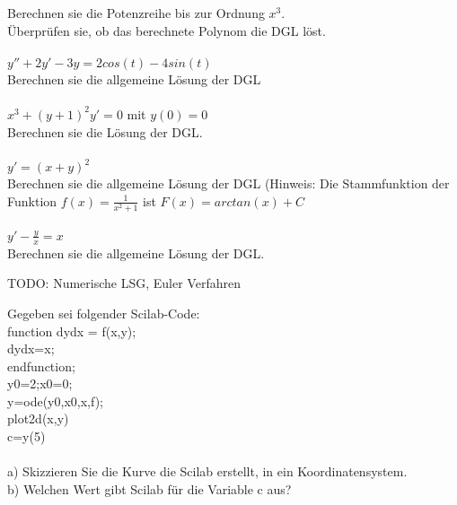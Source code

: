 \documentclass[A4]{scrartcl}
\begin{document}
Berechnen sie die Potenzreihe bis zur Ordnung $x^3$.\\
Überprüfen sie, ob das berechnete Polynom die DGL löst.\\\\
$y'' + 2y' - 3y = 2cos(t)-4sin(t)$\\
Berechnen sie die allgemeine Lösung der DGL\\\\
$x^3 + (y+1)^2 y' =0$ mit $y(0) =0$\\
Berechnen sie die Lösung der DGL.\\\\
$y'=(x+y)^2$\\
Berechnen sie die allgemeine Lösung der DGL 
(Hinweis: Die Stammfunktion der Funktion $f(x) = \frac{1}{x^2 +1}$ ist $F(x) = arctan(x)+C$\\\\
$y'- \frac{y}{x} = x$\\
Berechnen sie die allgemeine Lösung der DGL.

TODO: Numerische LSG, Euler Verfahren
\newpage


Gegeben sei folgender Scilab-Code:\\
function dydx = f(x,y);\\
dydx=x;\\
endfunction;\\
y0=2;x0=0;\\
y=ode(y0,x0,x,f);\\
plot2d(x,y)\\
c=y(5)\\\\
a) Skizzieren Sie die Kurve die Scilab erstellt, in ein Koordinatensystem.\\
b) Welchen Wert gibt Scilab für die Variable c aus?\\
\end{document}
